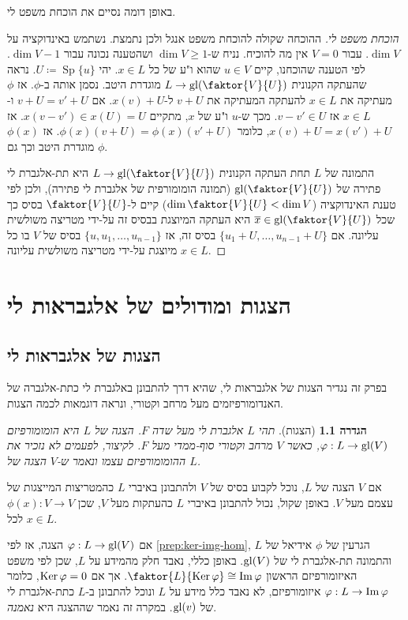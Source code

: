 \documentclass{report}
\theoremstyle{break}
\newtheorem{definition}[definition]{הגדרה}
\theoremstyle{MyNonumberbreak}
\newtheorem{proof}{הוכחה}
\DeclareMathOperator{\Sp}{Sp}
\begin{document}
באופן דומה נסיים את הוכחת משפט לי.
\begin{proof}[הוכחת משפט לי]
	ההוכחה שקולה להוכחת משפט אנגל ולכן נתמצת. נשתמש באינדוקציה על $\dim V$. עבור $V = 0$ אין מה להוכיח. נניח ש-$\dim V \ge 1$ ושהטענה נכונה עבור $\dim V - 1$. לפי הטענה שהוכחנו, קיים $u \in V$ שהוא ו"ע של כל $x \in L$. יהי $U \coloneqq \Sp\{u\}$. נראה שהעתקה הקנונית $L \to \gl(\faktor{V}{U})$ מוגדרת היטב. נסמן אותה ב-$\phi$. אז $\phi$ מעתיקה את $x \in L$ להעתקה המעתיקה את $v + U$ ל-$x(v) + U$. אם $v + U = v' + U$ ו-$x \in L$ אז $v - v' \in U$. מכך ש-$u$ ו"ע של $x$, מתקיים $x(v - v') \in x(U) = U$. אז $x(v) + U = x(v') + U$, כלומר $\phi(x)(v + U) = \phi(x)(v' + U)$. אז $\phi(x)$ מוגדרת היטב וכך גם $\phi$.
	
	התמונה של $L$ תחת העתקה הקנונית $L \to \gl(\faktor{V}{U})$ היא תת-אלגברת לי פתירה של $\gl(\faktor{V}{U})$ (תמונה הומומורפית של אלגברת לי פתירה), ולכן לפי טענת האינדוקציה ($\dim\faktor{V}{U} < \dim V$) קיים ל-$\faktor{V}{U}$ בסיס כך שכל $\overline{x} \in \gl(\faktor{V}{U})$ היא העתקה המיוצגת בבסיס זה על-ידי מטריצה משולשית עליונה. אם $\{u_1 + U, \ldots, u_{n-1} + U\}$ בסיס זה, אז $\{u, u_1, \ldots, u_{n-1}\}$ בסיס של $V$ בו כל $x \in L$ מיוצגת על-ידי מטריצה משולשית עליונה.
\end{proof}


\chapter{הצגות ומודולים של אלגבראות לי}
\section{הצגות של אלגבראות לי}
בפרק זה נגדיר הצגות של אלגבראות לי, שהיא דרך להתבונן באלגברת לי כתת-אלגברה של האנדומורפיזמים מעל מרחב וקטורי, ונראה דוגמאות לכמה הצגות.
\begin{definition}[הצגות]
	תהי $L$ אלגברת לי מעל שדה $F$. \textit{הצגה של $L$} היא הומומורפיזם $\varphi : L \to \operatorname{gl}(V)$, כאשר $V$ מרחב וקטורי סוף-ממדי מעל $F$. לקיצור, לפעמים לא נזכיר את ההומומורפיזם עצמו ונאמר ש-$V$ הצגה של $L$.
\end{definition}
אם $V$ הצגה של $L$, נוכל לקבוע בסיס של $V$ ולהתבונן באיברי $L$ כהמטריצות המייצגות של עצמם מעל $V$. באופן שקול, נכול להתבונן באיברי $L$ כהעתקות מעל $V$, שכן $\phi(x) : V \to V$ לכל $x \in L$.

אם $\varphi : L \to \operatorname{gl}(V)$ הצגה, אז לפי \autoref*{prep:ker-img-hom}, הגרעין של $\phi$ אידיאל של $L$ והתמונה תת-אלגברת לי של $\operatorname{gl}(V)$. באופן כללי, נאבד חלק מהמידע על $L$, שכן לפי משפט האיזומורפיזם הראשון $\faktor{L}{\Ker\phi} \cong \Img\phi$. אך אם $\operatorname{Ker}\varphi = 0$, כלומר $\varphi : L \to \operatorname{Im}\varphi$ איזומורפיזם, לא נאבד כלל מידע על $L$ ונוכל להתבונן ב-$L$ כתת-אלגברת לי של $\operatorname{gl}(v)$. במקרה זה נאמר שההצגה היא \textit{נאמנה}.
\end{document}
